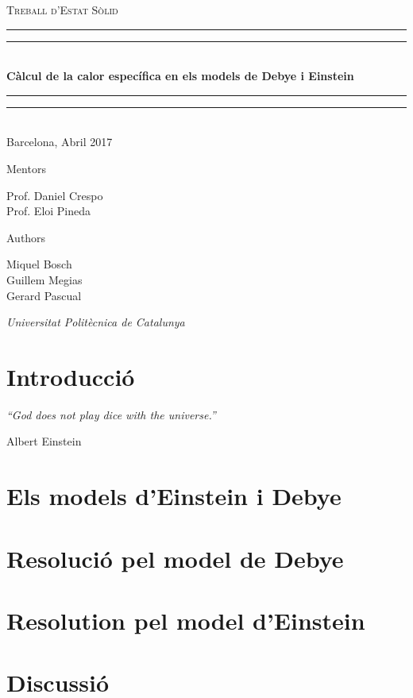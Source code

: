 \documentclass[12pt, a4paper]{article}
\newcommand*{\titleGP}{\begingroup %
\centering %

\scshape %
Treball d'Estat Sòlid \\ %
[\baselineskip] %

\vspace*{2\baselineskip} %

\rule{\textwidth}{1.6pt}\vspace*{-\baselineskip}\vspace*{2pt} %
\rule{\textwidth}{0.4pt}\\[\baselineskip] %

{\LARGE \textbf{Càlcul de la calor específica en els models de Debye i Einstein}}\\[0.2\baselineskip] %

\rule{\textwidth}{0.4pt}\vspace*{-\baselineskip}\vspace{3.2pt} %
\rule{\textwidth}{1.6pt}\\[\baselineskip] %


Barcelona,  Abril 2017\par %

\vspace*{\baselineskip} %

\vfill %

Mentors \\[\baselineskip]
{\Large Prof. Daniel Crespo \\ Prof. Eloi Pineda\par} %

\vfill %

Authors \\[\baselineskip]
{\Large Miquel Bosch \\ Guillem Megias \\ Gerard Pascual \par} %
{\itshape Universitat Politècnica de Catalunya \par} %

\vfill %


\endgroup}
\begin{document}
\titleGP %
\thispagestyle{empty} %



\newpage %


\tableofcontents %
\newpage %



\section{Introducció}

\begin{flushright} 
\footnotesize \emph{\textquotedblleft God does not play dice with the universe.\textquotedblright}

Albert Einstein

\end{flushright}

\lipsum[5-6]

\section{Els models d'Einstein i Debye}\label{Description}

\lipsum[5-6]



\newpage

\section{Resolució pel model de Debye}
\lipsum[10-14]

\newpage

\section{Resolution pel model d'Einstein} 
\lipsum[5-6]





\section{Discussió} 
\lipsum[5-6]
 
\newpage


\end{document}
